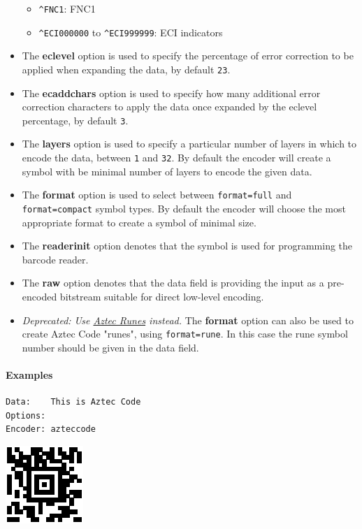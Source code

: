 \begin{itemize}
  \begin{itemize}
  \tightlist
  \item
    \texttt{\^{}FNC1}: FNC1
  \item
    \texttt{\^{}ECI000000} to \texttt{\^{}ECI999999}: ECI indicators
  \end{itemize}
\item
  The \textbf{eclevel} option is used to specify the percentage of error
  correction to be applied when expanding the data, by default
  \texttt{23}.
\item
  The \textbf{ecaddchars} option is used to specify how many additional
  error correction characters to apply the data once expanded by the
  eclevel percentage, by default \texttt{3}.
\item
  The \textbf{layers} option is used to specify a particular number of
  layers in which to encode the data, between \texttt{1} and
  \texttt{32}. By default the encoder will create a symbol with be
  minimal number of layers to encode the given data.
\item
  The \textbf{format} option is used to select between
  \texttt{format=full} and \texttt{format=compact} symbol types. By
  default the encoder will choose the most appropriate format to create
  a symbol of minimal size.
\item
  The \textbf{readerinit} option denotes that the symbol is used for
  programming the barcode reader.
\item
  The \textbf{raw} option denotes that the data field is providing the
  input as a pre-encoded bitstream suitable for direct low-level
  encoding.
\item
  \emph{Deprecated: Use \protect\hyperlink{aztec-runes}{Aztec Runes}
  instead.} The \textbf{format} option can also be used to create Aztec
  Code "runes", using \texttt{format=rune}. In this case the rune symbol
  number should be given in the data field.
\end{itemize}

\hypertarget{examples-4}{%
\paragraph{Examples}\label{examples-4}}

\begin{verbatim}
Data:    This is Aztec Code
Options: 
Encoder: azteccode
\end{verbatim}

\includegraphics{images/aztec-1.eps}

